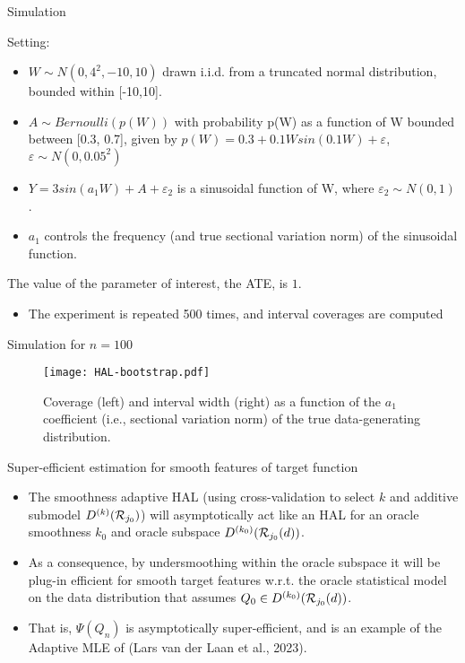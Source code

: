 \documentclass[t]{beamer}
\newlength{\wideitemsep}
\let\olditem\item
\renewcommand{\item}{\setlength{\itemsep}{\wideitemsep}\olditem}
\begin{document}
\begin{frame}{Simulation}

Setting:
\begin{itemize}
  \item $W \sim N(0, 4^2, -10, 10)$ drawn i.i.d. from a truncated normal distribution, bounded within [-10,10].
  \item $A \sim Bernoulli(p(W))$ with probability p(W) as a function of W bounded between [0.3, 0.7], given by $p(W) = 0.3 + 0.1Wsin(0.1W) + \varepsilon$, $\varepsilon \sim N(0,0.05^2)$
  \item $Y = 3sin(a_1 W) + A + \varepsilon_2$ is a sinusoidal function of W, where $\varepsilon_2 \sim N(0,1)$.
  \item $a_1$ controls the frequency (and true sectional variation norm) of the sinusoidal function.
\end{itemize}
The value of the parameter of interest, the ATE, is $1$.

\begin{itemize}
    \item The experiment is repeated 500 times, and interval coverages are computed
\end{itemize}

\end{frame}

\begin{frame}{Simulation for $n=100$}
\begin{figure}
\centering
\texttt{[image: HAL-bootstrap.pdf]}
\caption{Coverage (left) and interval width (right) as a function of the $a_1$ coefficient (i.e., sectional variation norm) of the true data-generating distribution.}
\end{figure}
\end{frame}


\begin{frame}{Super-efficient estimation for smooth features of target function}
\begin{itemize}
\item The smoothness adaptive HAL (using cross-validation to select $k$ and additive submodel $D^{(k)}({\cal R}_{j_0})$) will asymptotically act like an HAL for an oracle smoothness $k_0$ and oracle subspace $D^{(k_0)}({\cal R}_{j_0}(d))$.
\item As a consequence, by undersmoothing within the oracle subspace it will be plug-in efficient for smooth target features w.r.t. the oracle statistical model on the data distribution that assumes $Q_0\in D^{(k_0)}({\cal R}_{j_0}(d))$.
\item That is, $\Psi(Q_n)$ is asymptotically super-efficient, and is an example of the Adaptive MLE of  (Lars van der Laan et al., 2023).
\end{itemize}
\end{frame}
\end{document}
